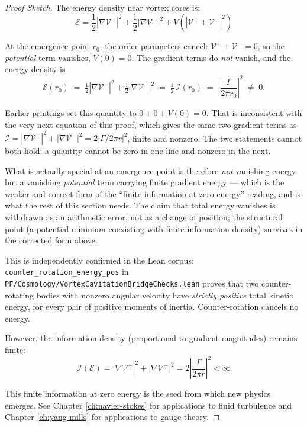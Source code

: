 \begin{proof}[Proof Sketch]
The energy density near vortex cores is:
\begin{equation}
\mathcal{E} = \frac{1}{2}|\nabla\mathcal{V}^+|^2 + \frac{1}{2}|\nabla\mathcal{V}^-|^2 + V(|\mathcal{V}^+ + \mathcal{V}^-|^2)
\end{equation}

At the emergence point $r_0$, the order parameters cancel:
$\mathcal{V}^+ + \mathcal{V}^- = 0$, so the \emph{potential} term vanishes,
$V(0) = 0$. The gradient terms do \emph{not} vanish, and the energy density is
\begin{equation}
\mathcal{E}(r_0) \;=\; \tfrac{1}{2}|\nabla\mathcal{V}^+|^2 + \tfrac{1}{2}|\nabla\mathcal{V}^-|^2
\;=\; \tfrac{1}{2}\,\mathcal{I}(r_0) \;=\; \left|\frac{\Gamma}{2\pi r_0}\right|^2 \;\neq\; 0 .
\label{eq:emergence-energy-corrected}
\end{equation}

\begin{remark}
\label{rem:emergence-energy-2026-10-03}
Earlier printings set this quantity to $0 + 0 + V(0) = 0$. That is inconsistent
with the very next equation of this proof, which gives the same two gradient
terms as $\mathcal{I} = |\nabla\mathcal{V}^+|^2 + |\nabla\mathcal{V}^-|^2
= 2|\Gamma/2\pi r|^2$, finite and nonzero. The two statements cannot both hold:
a quantity cannot be zero in one line and nonzero in the next.

What is actually special at an emergence point is therefore \emph{not} vanishing
energy but a vanishing \emph{potential} term carrying finite gradient energy ---
which is the weaker and correct form of the ``finite information at zero energy''
reading, and is what the rest of this section needs. The claim that total energy
vanishes is withdrawn as an arithmetic error, not as a change of position; the
structural point (a potential minimum coexisting with finite information density)
survives in the corrected form above.

This is independently confirmed in the Lean corpus:
\texttt{counter\_rotation\_energy\_pos} in
\texttt{PF/Cosmology/VortexCavitationBridgeChecks.lean} proves that two
counter-rotating bodies with nonzero angular velocity have \emph{strictly
positive} total kinetic energy, for every pair of positive moments of inertia.
Counter-rotation cancels no energy.
\end{remark}

However, the information density (proportional to gradient magnitudes) remains finite:
\begin{equation}
\mathcal{I}(\mathcal{E}) = |\nabla\mathcal{V}^+|^2 + |\nabla\mathcal{V}^-|^2 = 2\left|\frac{\Gamma}{2\pi r}\right|^2 < \infty
\end{equation}

This finite information at zero energy is the seed from which new physics emerges. See Chapter \ref{ch:navier-stokes} for applications to fluid turbulence and Chapter \ref{ch:yang-mills} for applications to gauge theory.
\end{proof}

